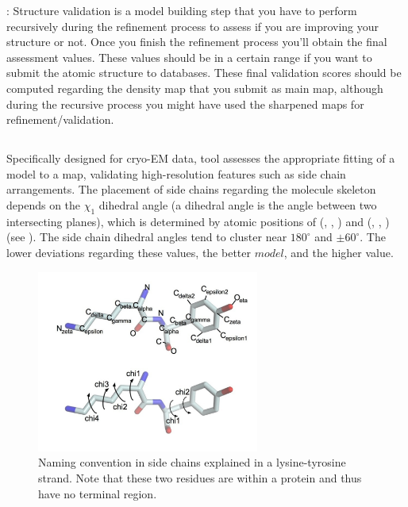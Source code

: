  : Structure validation is a model building step that you have to perform recursively during the refinement process to assess if you are improving your structure or not. Once you finish the refinement process you'll obtain the final assessment values. These values should be in a certain range if you want to submit the atomic structure to databases. These final validation scores should be computed regarding the density map that you submit as main map, although during the recursive process you might have used the sharpened maps for refinement/validation.


 \subsection*{\emringer}
 
 Specifically designed for cryo-EM data, \emringer tool assesses the appropriate fitting of a model to a map, validating high-resolution features such as side chain arrangements. The placement of side chains regarding the molecule skeleton depends on the $\chi_{1}$ dihedral angle (a dihedral angle is the angle between two intersecting planes), which is determined by atomic positions of (, , ) and (, , ) (see ). The side chain dihedral angles tend to cluster near $180^\circ$ and $\pm60^\circ$. The lower deviations regarding these values, the better $model$, and the higher \emringer value.  

   \begin{figure}[H]
  \centering 
  \captionsetup{width=.9\linewidth} 
  \includegraphics[width=0.65\textwidth]{Images/sidechains}
  \caption{Naming convention in side chains explained in a lysine-tyrosine strand. Note that these two residues are within a protein and thus have no terminal region.}
  \label{fig:emringer_chi1}
  \end{figure}

